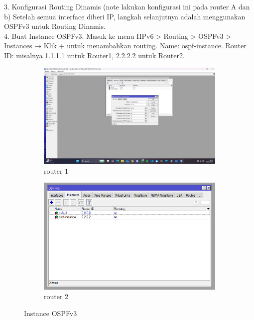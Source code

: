 3. Konfigurasi Routing Dinamis (note lakukan konfigurasi ini pada router A dan b) Setelah semua interface diberi IP, langkah selanjutnya adalah menggunakan OSPFv3 untuk Routing Dinamis. \\
4. Buat Instance OSPFv3. Masuk ke menu IIPv6 > Routing > OSPFv3 > Instances → Klik + untuk menambahkan routing. Name: ospf-instance. Router ID: misalnya 1.1.1.1 untuk Router1, 2.2.2.2 untuk Router2.
\begin{figure}[H]
    \centering
    \begin{subfigure}[b]{0.3\linewidth}
      \centering
      \includegraphics[width=\linewidth]{image/dinamis2.jpg}
      \caption{router 1}
    \end{subfigure}
    \hspace{1cm}
    \begin{subfigure}[b]{0.3\linewidth}
      \centering
      \includegraphics[width=\linewidth]{image/dinamis1.png}
      \caption{router 2}
    \end{subfigure}
    \caption{Instance OSPFv3}
\end{figure}
